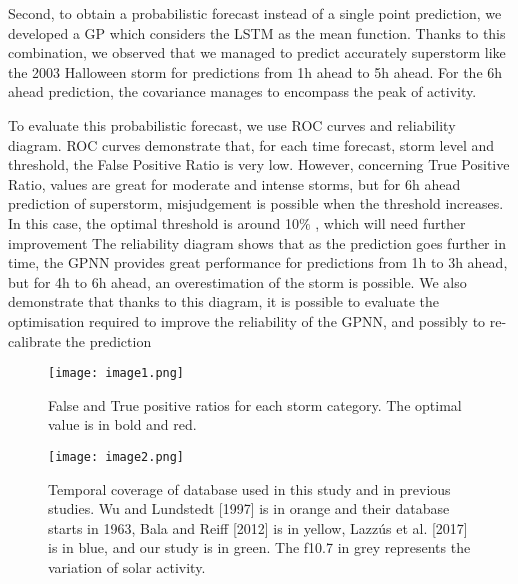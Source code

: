 Second, to obtain a probabilistic forecast instead of a single point prediction, we developed a GP which 
considers the LSTM as the mean function. Thanks to this combination, we observed that we managed to predict 
accurately superstorm like the 2003 Halloween storm for predictions from 1h ahead to 5h ahead. For the 
6h ahead prediction, the covariance manages to encompass the peak of activity. 

To evaluate this probabilistic forecast, we use ROC curves and reliability diagram. ROC curves demonstrate that, 
for each time forecast, storm level and threshold, the False Positive Ratio is very low. However, concerning 
True Positive Ratio, values are great for moderate and intense storms, but for 6h ahead prediction of superstorm, 
misjudgement is possible when the threshold increases. In this case, the optimal threshold is around 10$\%$ , 
which will need further improvement The reliability diagram shows that as the prediction goes further in time, 
the GPNN provides great performance for predictions from 1h to 3h ahead, but for 4h to 6h ahead, 
an overestimation of the storm is possible. We also demonstrate that thanks to this diagram, it is possible to 
evaluate the optimisation required to improve the reliability of the GPNN, and possibly to 
re-calibrate the prediction



\begin{figure}
	\texttt{[image: image1.png]}
	\caption{False and True positive ratios for each storm category. The optimal value is in bold and red.}
	\label{fig:tpfp}
\end{figure}





\begin{figure}
	\texttt{[image: image2.png]}
	\caption{Temporal coverage of database used in this study and in previous studies. Wu and Lundstedt [1997] is in orange and their database starts in 1963, Bala and Reiff [2012] is in yellow, Lazzús et al. [2017] is in blue, and our study is in green. The f10.7 in grey represents the variation of solar activity.}
	\label{fig:datacoverage}
\end{figure}




